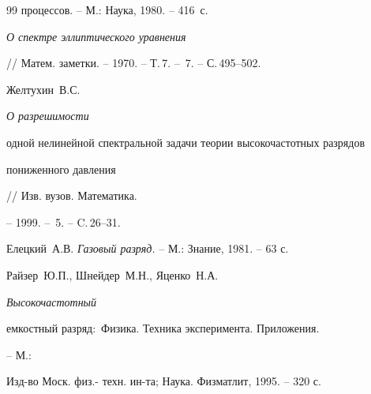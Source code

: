 \begin{thebibliography}{99}
{процессов}. -- М.: Наука, 1980. -- 416~с.







{\em О спектре эллиптического уравнения}


// Матем. заметки. -- 1970. -- Т.\,7. -- \No\,7. -- С.\,495--502.





 Желтухин~В.С. {\em О разрешимости


одной нелинейной спектральной задачи теории высокочастотных разрядов


пониженного давления} // Изв. вузов. Математика.


-- 1999. -- \No\,5. -- C.\,26--31.







Елецкий~А.В. {\em Газовый разряд.} -- М.: Знание, 1981. -- 63 с.







Райзер~Ю.П., Шнейдер~М.Н., Яценко~Н.А. {\em Высокочастотный


емкостный разряд\/${:}$ Физика. Техника эксперимента. Приложения.} -- М.:


Изд-во Моск. физ.- техн. ин-та; Наука. Физматлит, 1995. -- 320 с.





\end{thebibliography}





\vskip 0.5cm














\label{end}








